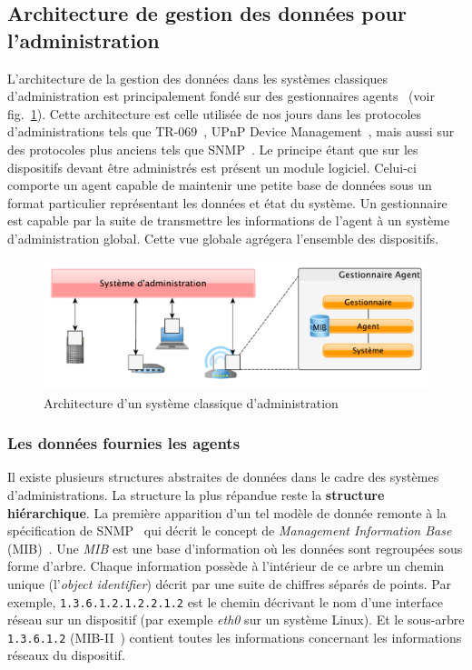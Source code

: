 \subsection{Architecture de gestion des données pour l'administration}
L'architecture de la gestion des données dans les systèmes classiques d'administration est principalement fondé sur des gestionnaires agents~\cite{CCITT:X700} (voir fig.~\ref{fig:rw:supervision:administration}). Cette architecture est celle utilisée de nos jours dans les protocoles d'administrations tels que TR-069~\cite{BBF:tr069}, UPnP Device Management~\cite{UPnP:DM2}, mais aussi sur des protocoles plus anciens tels que SNMP~\cite{IETF:SNMP}. Le principe étant que sur les dispositifs devant être administrés est présent un module logiciel. Celui-ci comporte un agent capable de maintenir une petite base de données sous un format particulier représentant les données et état du système. Un gestionnaire est capable par la suite de transmettre les informations de l'agent à un système d'administration global. Cette vue globale agrégera l'ensemble des dispositifs.
\begin{figure}[ht]
    \centering
    \includegraphics[width=.75\textwidth]{fig/rw-supervision-administration}
    \caption{Architecture d'un système classique d'administration}\label{fig:rw:supervision:administration}
\end{figure}

\subsubsection{Les données fournies les agents}
Il existe plusieurs structures abstraites de données dans le cadre des systèmes d'administrations. La structure la plus répandue reste la \textbf{structure hiérarchique}. La première apparition d'un tel modèle de donnée remonte à la spécification de SNMP~\cite{IETF:SNMP} qui décrit le concept de \textit{Management Information Base} (MIB)~\cite{IETF:MIB}. Une \textit{MIB} est une base d'information où les données sont regroupées sous forme d'arbre. Chaque information possède à l'intérieur de ce arbre un chemin unique (l'\textit{object identifier}) décrit par une suite de chiffres séparés de points. Par exemple, \verb|1.3.6.1.2.1.2.2.1.2| est le chemin décrivant le nom d'une interface réseau sur un dispositif (par exemple \textit{eth0} sur un système Linux). Et le sous-arbre \verb|1.3.6.1.2| (MIB-II~\cite{IETF:MIB-II}) contient toutes les informations concernant les informations réseaux du dispositif.

